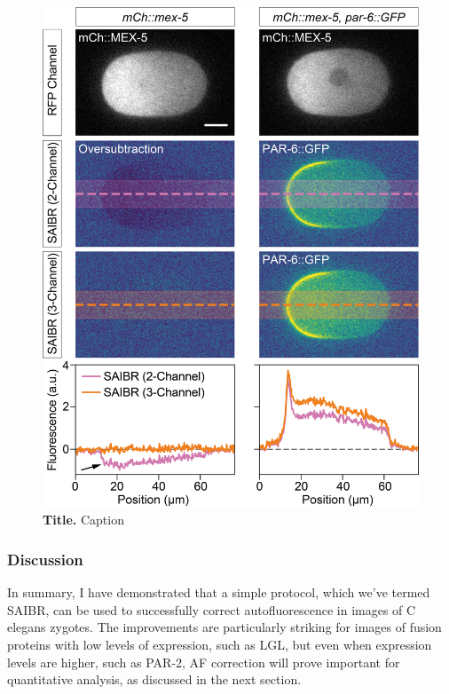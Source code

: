 \documentclass[12pt]{"article"}
\newcommand{\mycaption}[2]{\caption[#1]{\textbf{#1.} #2}}
\begin{document}
\begin{figure}[!h]
\includegraphics[scale=1]{saibr_3channel_correction}
\setlength{\abovecaptionskip}{20pt}
\centering
\mycaption{Title}{Caption}
\end{figure}


\subsubsection{Discussion}

In summary, I have demonstrated that a simple protocol, which we’ve termed SAIBR, can be used to successfully correct autofluorescence in images of C elegans zygotes. The improvements are particularly striking for images of fusion proteins with low levels of expression, such as LGL, but even when expression levels are higher, such as PAR-2, AF correction will prove important for quantitative analysis, as discussed in the next section. \\
\end{document}
